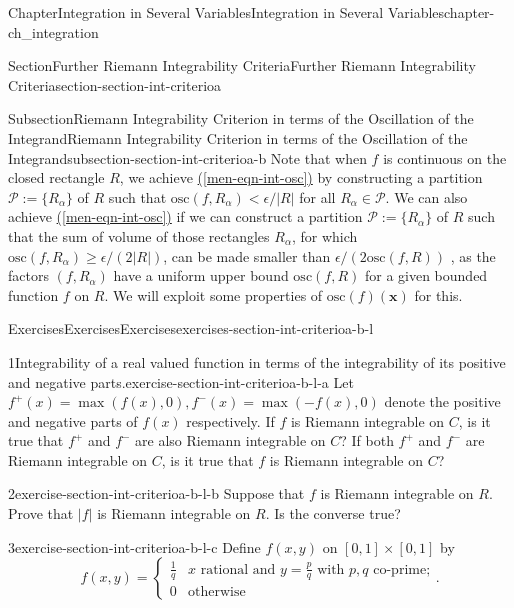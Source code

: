 \documentclass[oneside,10pt,]{book}
\newcommand{\xreffont}{\relax}
\numberwithin{equation}{section}
\newcommand{\bx}{\mathbf{x}}
\newcommand{\cP}{\mathcal{P}}
\newcommand{\osc}{\text{osc}}
\newcommand{\amp}{&}
\begin{document}
\begin{chapterptx}{Chapter}{Integration in Several Variables}{}{Integration in Several Variables}{}{}{chapter-ch_integration}
\begin{sectionptx}{Section}{Further Riemann Integrability Criteria}{}{Further Riemann Integrability Criteria}{}{}{section-section-int-criterioa}
\begin{subsectionptx}{Subsection}{Riemann Integrability Criterion in terms of the Oscillation of the Integrand}{}{Riemann Integrability Criterion in terms of the Oscillation of the Integrand}{}{}{subsection-section-int-criterioa-b}
Note that when \(f\) is continuous on the closed rectangle \(R\), we achieve \hyperref[men-eqn-int-osc]{({\xreffont\ref{men-eqn-int-osc}})} by constructing a partition \(\cP:=\{R_{\alpha}\}\) of \(R\) such that \(\osc(f, R_{\alpha}) < \epsilon/\vert R\vert\) for all \(R_{\alpha} \in \cP\). We can also achieve \hyperref[men-eqn-int-osc]{({\xreffont\ref{men-eqn-int-osc}})} if we can construct a partition \(\cP:=\{R_{\alpha}\}\) of \(R\) such that the sum of volume of those rectangles \(R_{\alpha}\), for which \(\osc(f, R_{\alpha})\ge \epsilon/(2\vert R\vert)\), can be made smaller than \(\epsilon/(2 \osc(f, R))\) , as the factors \((f, R_{\alpha})\) have a uniform upper bound \(\osc(f, R)\) for a given bounded function \(f\) on \(R\). We will exploit some properties of \(\osc(f)(\bx)\) for this.%
%
%
\typeout{************************************************}
\typeout{************************************************}
%
\begin{exercises-subsubsection-numberless}{Exercises}{Exercises}{}{Exercises}{}{}{exercises-section-int-criterioa-b-l}
\begin{divisionexercise}{1}{Integrability of a real valued function in terms of the integrability of its positive and negative parts.}{}{exercise-section-int-criterioa-b-l-a}%
Let \(f^{+}(x)=\max (f(x), 0), f^{-}(x)=\max(-f(x), 0)\) denote the positive and negative parts of \(f(x)\) respectively. If \(f\) is Riemann integrable on \(C\), is it true that \(f^{+}\) and \(f^{-}\) are also Riemann integrable on \(C\)? If both \(f^{+}\) and \(f^{-}\) are  Riemann integrable on \(C\), is it true that \(f\) is Riemann integrable on \(C\)?%
\end{divisionexercise}%
\begin{divisionexercise}{2}{}{}{exercise-section-int-criterioa-b-l-b}%
Suppose that \(f\) is Riemann integrable on \(R\). Prove that \(|f|\) is Riemann integrable on \(R\). Is the converse true?%
\end{divisionexercise}%
\begin{divisionexercise}{3}{}{}{exercise-section-int-criterioa-b-l-c}%
Define \(f(x, y)\) on \([0, 1]\times [0, 1]\) by%
\begin{equation*}
f(x, y)=\begin{cases} \frac 1q \amp x \text{ rational and $y=\frac pq$ with $p, q$ co-prime;} \\
0 \amp \text{otherwise}
\end{cases}\text{.}
\end{equation*}

\end{divisionexercise}
\end{exercises-subsubsection-numberless}
\end{subsectionptx}
\end{sectionptx}
\end{chapterptx}
\end{document}
